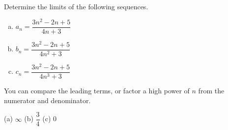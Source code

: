 \begin{Mquestion}
Determine the limits of the following sequences.
\begin{enumerate}[(a)]
\item $a_n = \dfrac{3n^2-2n+5}{4n+3}$
\item $b_n = \dfrac{3n^2-2n+5}{4n^2+3}$
\item $c_n = \dfrac{3n^2-2n+5}{4n^3+3}$
\end{enumerate}
\end{Mquestion}
\begin{hint}
You can compare the leading terms, or factor a high power of $n$ from the numerator and denominator.
\end{hint}
\begin{answer} (a) $\infty$ \qquad (b) $\dfrac{3}{4}$
\qquad (c) 0
\end{answer}
